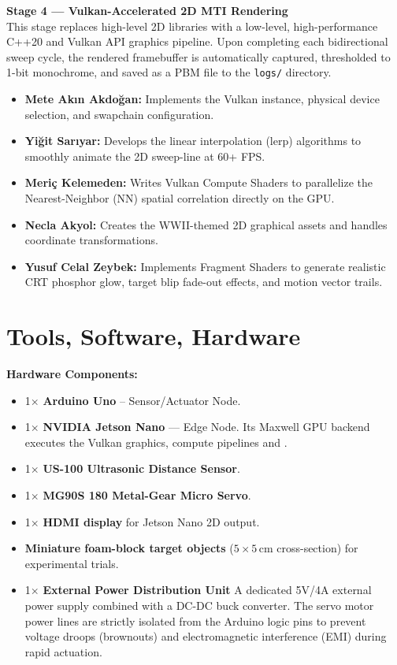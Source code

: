 \documentclass[14pt]{article}
\begin{document}
\textbf{Stage 4 --- Vulkan-Accelerated 2D MTI Rendering} \\
This stage replaces high-level 2D libraries with a low-level, high-performance C++20 and Vulkan API graphics pipeline. Upon completing each bidirectional sweep cycle, the rendered framebuffer is automatically captured, thresholded to 1-bit monochrome, and saved as a PBM file to the \texttt{logs/} directory.
\begin{itemize}
    \item \textbf{Mete Akın Akdoğan:} Implements the Vulkan instance, physical device selection, and swapchain configuration.
    \item \textbf{Yiğit Sarıyar:} Develops the linear interpolation (lerp) algorithms to smoothly animate the 2D sweep-line at 60+ FPS.
    \item \textbf{Meriç Kelemeden:} Writes Vulkan Compute Shaders to parallelize the Nearest-Neighbor (NN) spatial correlation directly on the GPU.
    \item \textbf{Necla Akyol:} Creates the WWII-themed 2D graphical assets and handles coordinate transformations.
    \item \textbf{Yusuf Celal Zeybek:} Implements Fragment Shaders to generate realistic CRT phosphor glow, target blip fade-out effects, and motion vector trails.
\end{itemize}

\section{Tools, Software, Hardware}
\textbf{Hardware Components:}
\begin{itemize}
    \item 1$\times$ \textbf{Arduino Uno} -- Sensor/Actuator Node.
    \item 1$\times$ \textbf{NVIDIA Jetson Nano} --- Edge Node. Its Maxwell GPU backend executes the Vulkan graphics, compute pipelines and .
    \item 1$\times$ \textbf{US-100 Ultrasonic Distance Sensor}.
    \item 1$\times$ \textbf{MG90S 180\textdegree{} Metal-Gear Micro Servo}.
    \item 1$\times$ \textbf{HDMI display} for Jetson Nano 2D output.
    \item \textbf{Miniature foam-block target objects} ($5\times5$\,cm cross-section) for experimental trials.
    \item 1$\times$ \textbf{External Power Distribution Unit} A dedicated 5V/4A external power supply combined with a DC-DC buck converter. The servo motor power lines are strictly isolated from the Arduino logic pins to prevent voltage droops (brownouts) and electromagnetic interference (EMI) during rapid actuation.
\end{itemize}
\end{document}
